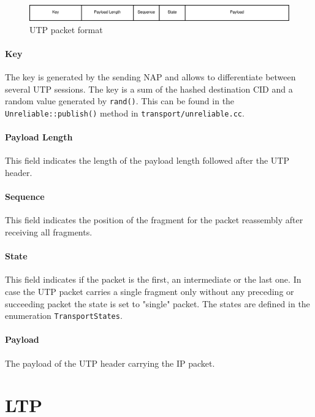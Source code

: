 \documentclass[a4paper,11pt,titlepage]{report}
\begin{document}
\begin{figure}[!htb]
	\centering
	\includegraphics[width=1\linewidth]{eps/utpPacketFormat}
	\caption{\ac{UTP} packet format}
	\label{fig:UnreliableTransportProtocol}
\end{figure}

\paragraph{Key} The key is generated by the sending \ac{NAP} and allows to differentiate between several \ac{UTP} sessions. The key is a sum of the hashed destination \ac{CID} and a random value generated by \texttt{rand()}. This can be found in the \texttt{Unreliable::publish()} method in \texttt{transport/unreliable.cc}.

\paragraph{Payload Length} This field indicates the length of the payload length followed after the \ac{UTP} header.

\paragraph{Sequence} This field indicates the position of the fragment for the packet reassembly after receiving all fragments. 

\paragraph{State} This field indicates if the packet is the first, an intermediate or the last one. In case the \ac{UTP} packet carries a single fragment only without any preceding or succeeding packet the state is set to "single" packet. The states are defined in the enumeration \texttt{TransportStates}.

\paragraph{Payload} The payload of the \ac{UTP} header carrying the IP packet.
\section{\acl{LTP}}\label{sec:Transport_LTP}
\end{document}
